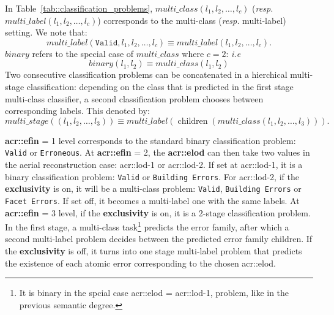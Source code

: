         In Table~\ref{tab::classification_problems}, $multi\_class(l_1, l_2, \dots, l_c)$ (\textit{resp.} $multi\_label(l_1, l_2, \dots, l_c)$) corresponds to the multi-class (\textit{resp.} multi-label) setting.
        We note that:
        \begin{equation*}
            multi\_label(\texttt{Valid}, l_1, l_2, \dots, l_c) \equiv multi\_label(l_1, l_2, \dots, l_c).
        \end{equation*}
        $binary$ refers to the special case of $multi\_class$ where $c = 2$: \textit{i.e}
        \begin{equation*}
            binary(l_1, l_2) \equiv multi\_class(l_1, l_2)
        \end{equation*}
        Two consecutive classification problems can be concatenated in a hierchical multi-stage classification:
        depending on the class that is predicted in the first stage multi-class classifier, a second classification problem chooses between corresponding labels.
        This denoted by:
        \begin{equation*}
            multi\_stage((l_1, l_2, \dots, l_3)) \equiv multi\_label(\operatorname{children}(multi\_class(l_1, l_2, \dots, l_3))).
        \end{equation*}
            
        \textbf{\gls{acr::efin}} = 1 level corresponds to the standard binary classification problem: \texttt{Valid} or \texttt{Erroneous}.
        At \textbf{\gls{acr::efin}} = 2, the \textbf{\gls{acr::elod}} can then take two values in the aerial reconstruction case: \gls{acr::lod}-1 or \gls{acr::lod}-2.
        If set at \gls{acr::lod}-1, it is a binary classification problem: \texttt{Valid} or \texttt{Building Errors}.
        For \gls{acr::lod}-2, if the \textbf{exclusivity} is on, it will be a multi-class problem: \texttt{Valid}, \texttt{Building Errors} or \texttt{Facet Errors}.
        If set off, it becomes a multi-label one with the same labels.
        At \textbf{\gls{acr::efin}} = 3 level, if the \textbf{exclusivity} is on, it is a 2-stage classification problem.
        In the first stage, a multi-class task\footnote{It is binary in the spcial case \gls{acr::elod} = \gls{acr::lod}-1, problem, like in the previous semantic degree.}
        predicts the error family, after which a second multi-label problem decides between the predicted error family children.
        If the \textbf{exclusivity} is off, it turns into one stage multi-label problem that predicts the existence of each atomic error corresponding to the chosen \gls{acr::elod}.
    
